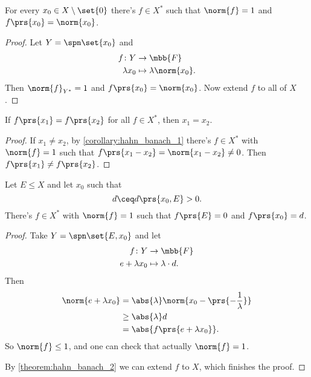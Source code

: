 \documentclass[10pt, twoside]{book}
\begin{document}
\begin{corollary} \label{corollary:hahn_banach_1}
For every $x_0 \in X \setminus \set{0}$ there's $f \in X^*$ such that $\norm{f} = 1$ and $f\prs{x_0} = \norm{x_0}$.
\end{corollary}

\begin{proof}
Let $Y= \spn\set{x_0}$ and
\begin{align*}
f \colon Y &\to \mbb{F} \\
\lambda x_0 &\mapsto \lambda \norm{x_0} \text{.}
\end{align*}
Then $\norm{f}_{Y^*} = 1$ and $f\prs{x_0} = \norm{x_0}$. Now extend $f$ to all of $X$.
\end{proof}

\begin{corollary}
If $f\prs{x_1} = f\prs{x_2}$ for all $f \in X^*$, then $x_1 = x_2$.
\end{corollary}

\begin{proof}
If $x_1 \neq x_2$, by \ref{corollary:hahn_banach_1} there's $f \in X^*$ with $\norm{f} = 1$ such that $f\prs{x_1 - x_2} = \norm{x_1 - x_2} \neq 0$. Then $f\prs{x_1} \neq f\prs{x_2}$.
\end{proof}

\begin{corollary} \label{corollary:hahn_banach_2}
Let $E \leq X$ and let $x_0$ such that
\[d \ceq d\prs{x_0, E} > 0 \text{.}\]
There's $f \in X^*$ with $\norm{f} = 1$ such that $f\prs{E} = 0$ and $f\prs{x_0} = d$.
\end{corollary}

\begin{proof}
Take $Y = \spn\set{E, x_0}$ and let
\begin{align*}
f \colon Y &\to \mbb{F} \\
e + \lambda x_0 &\mapsto \lambda \cdot d \text{.}
\end{align*}
Then
\begin{align*}
\norm{e + \lambda x_0} &= \abs{\lambda} \norm{x_0 - \prs{- \frac{1}{\lambda}}}
\\&\geq \abs{\lambda} d
\\&= \abs{f\prs{e + \lambda x_0}} \text{.}
\end{align*}
So $\norm{f} \leq 1$, and one can check that actually $\norm{f} = 1$.

By \ref{theorem:hahn_banach_2} we can extend $f$ to $X$, which finishes the proof.
\end{proof}
\end{document}
